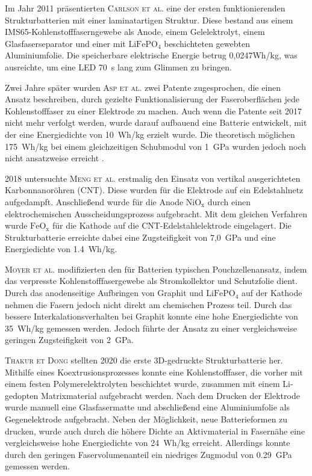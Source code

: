 Im Jahr 2011 präsentierten \textsc{Carlson et al.} \cite{Carlson2011} eine der ersten funktionierenden Strukturbatterien mit einer laminatartigen Struktur. Diese bestand aus einem IMS65-Kohlenstofffaserngewebe als Anode, einem Gelelektrolyt, einem Glasfaserseparator und einer mit $\text{LiFePO}_\text{4}$ beschichteten gewebten Aluminiumfolie. Die speicherbare elektrische Energie betrug 0,0247Wh/kg, was ausreichte, um eine LED 70~s lang zum Glimmen zu bringen.

Zwei Jahre später wurden \textsc{Asp et al.} \cite{Asp2013US,Asp2013CN} zwei Patente zugesprochen, die einen Ansatz beschreiben, durch gezielte Funktionalisierung der Faseroberflächen jede Kohlenstofffaser zu einer Elektrode zu machen. Auch wenn die Patente seit 2017 nicht mehr verfolgt werden, wurde darauf aufbauend eine Batterie entwickelt, mit der eine Energiedichte von 10~Wh/kg erzielt wurde. Die theoretisch möglichen 175~Wh/kg bei einem gleichzeitigen Schubmodul von 1~GPa wurden jedoch noch nicht ansatzweise erreicht \cite{Leijonmarck2013, Carlson2013}.

2018 untersuchte \textsc{Meng et al.} \cite{Meng2018} erstmalig den Einsatz von vertikal ausgerichteten Karbonnanoröhren (CNT). Diese wurden für die Elektrode auf ein Edelstahlnetz aufgedampft. Anschließend wurde für die Anode $\text{NiO}_\text{x}$ durch einen elektrochemischen Ausscheidungsprozess aufgebracht. Mit dem gleichen Verfahren wurde $\text{FeO}_\text{x}$ für die Kathode auf die CNT-Edelstahlelektrode eingelagert. Die Strukturbatterie erreichte dabei eine Zugsteifigkeit von 7,0~GPa und eine Energiedichte von 1.4~Wh/kg.

\textsc{Moyer et al.} \cite{Moyer2020} modifizierten den für Batterien typischen Pouchzellenansatz, indem das verpresste Kohlenstofffasergewebe als Stromkollektor und Schutzfolie dient. Durch das anodenseitige Aufbringen von Graphit und $\text{LiFePO}_\text{4}$ auf der Kathode nehmen die Fasern jedoch nicht direkt am chemischen Prozess teil. Durch das bessere Interkalationsverhalten bei Graphit konnte eine hohe Energiedichte von 35~Wh/kg gemessen werden. Jedoch führte der Ansatz zu einer vergleichsweise geringen Zugsteifigkeit von 2~GPa.

\textsc{Thakur et Dong} \cite{Thakur2020} stellten 2020 die erste 3D-gedruckte Strukturbatterie her. Mithilfe eines Koextrusionsprozesses konnte eine Kohlenstofffaser, die vorher mit einem festen Polymerelektrolyten beschichtet wurde, zusammen mit einem Li-gedopten Matrixmaterial aufgebracht werden. Nach dem Drucken der Elektrode wurde manuell eine Glasfasermatte und abschließend eine Aluminiumfolie als Gegenelektrode aufgebracht. Neben der Möglichkeit, neue Batterieformen zu drucken, wurde auch durch die höhere Dichte an Aktivmaterial in Fasernähe eine vergleichsweise hohe Energiedichte von 24~Wh/kg erreicht. Allerdings konnte durch den geringen Faservolumenanteil ein niedriges Zugmodul von 0.29~GPa gemessen werden.

